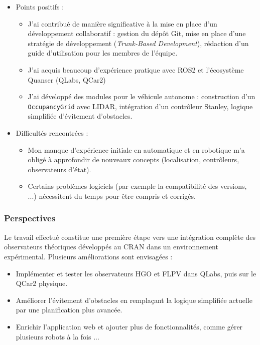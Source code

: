 \documentclass{name}
\begin{document}
\begin{itemize}
    \item Points positifs : 
    \begin{itemize}
        \item J’ai contribué de manière significative à la mise en place d’un développement collaboratif : gestion du dépôt Git, mise en place d’une stratégie de développement (\textit{Trunk-Based Development}), rédaction d’un guide d’utilisation pour les membres de l’équipe.
        \item J'ai acquis beaucoup d'expérience pratique avec ROS2 et l'écosystème Quanser (QLabs, QCar2)
        \item J'ai développé des modules pour le véhicule autonome : construction d'un \texttt{OccupancyGrid} avec LIDAR, intégration d'un contrôleur Stanley, logique simplifiée d'évitement d'obstacles.
    \end{itemize}
    
    \item Difficultés rencontrées : 
    \begin{itemize}
        \item Mon manque d'expérience initiale en automatique et en robotique m'a obligé à approfondir de nouveaux concepts (localisation, contrôleurs, observateurs d'état).
        \item Certains problèmes logiciels (par exemple la compatibilité des versions, ...) nécessitent du temps pour être compris et corrigés.
    \end{itemize}
\end{itemize}

\subsubsection{Perspectives}

Le travail effectué constitue une première étape vers une intégration complète des observateurs théoriques développés au CRAN dans un environnement expérimental. Plusieurs améliorations sont envisagées :

\begin{itemize}
    \item Implémenter et tester les observateurs HGO et FLPV dans QLabs, puis sur le QCar2 physique.
    \item Améliorer l’évitement d’obstacles en remplaçant la logique simplifiée actuelle par une planification plus avancée.
    \item Enrichir l'application web et ajouter plus de fonctionnalités, comme gérer plusieurs robots à la fois ...
\end{itemize}
\end{document}
